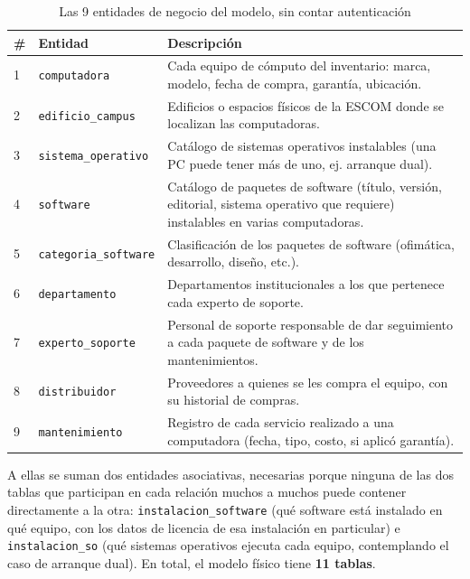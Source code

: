 \documentclass[10pt,a4paper]{article}
\begin{document}
\begin{table}[H]
	\centering
	\footnotesize
	\begin{tabular}{p{0.6cm} | p{3.2cm} | p{10.5cm}}\hline \hline
		\textbf{\#} & \textbf{Entidad} & \textbf{Descripción} \\ \hline \hline
		1 & \texttt{computadora} & Cada equipo de cómputo del inventario: marca, modelo, fecha de compra, garantía, ubicación. \\ \hline
		2 & \texttt{edificio\_campus} & Edificios o espacios físicos de la ESCOM donde se localizan las computadoras. \\ \hline
		3 & \texttt{sistema\_operativo} & Catálogo de sistemas operativos instalables (una PC puede tener más de uno, ej. arranque dual). \\ \hline
		4 & \texttt{software} & Catálogo de paquetes de software (título, versión, editorial, sistema operativo que requiere) instalables en varias computadoras. \\ \hline
		5 & \texttt{categoria\_software} & Clasificación de los paquetes de software (ofimática, desarrollo, diseño, etc.). \\ \hline
		6 & \texttt{departamento} & Departamentos institucionales a los que pertenece cada experto de soporte. \\ \hline
		7 & \texttt{experto\_soporte} & Personal de soporte responsable de dar seguimiento a cada paquete de software y de los mantenimientos. \\ \hline
		8 & \texttt{distribuidor} & Proveedores a quienes se les compra el equipo, con su historial de compras. \\ \hline
		9 & \texttt{mantenimiento} & Registro de cada servicio realizado a una computadora (fecha, tipo, costo, si aplicó garantía). \\ \hline \hline
	\end{tabular}
	\caption{Las 9 entidades de negocio del modelo, sin contar autenticación}
	\label{tabla:entidades}
\end{table}

A ellas se suman dos entidades asociativas, necesarias porque ninguna de las dos tablas que participan en cada relación muchos a muchos puede contener directamente a la otra: \texttt{instalacion\_software} (qué software está instalado en qué equipo, con los datos de licencia de esa instalación en particular) e \texttt{instalacion\_so} (qué sistemas operativos ejecuta cada equipo, contemplando el caso de arranque dual). En total, el modelo físico tiene \textbf{11 tablas}.
\end{document}
